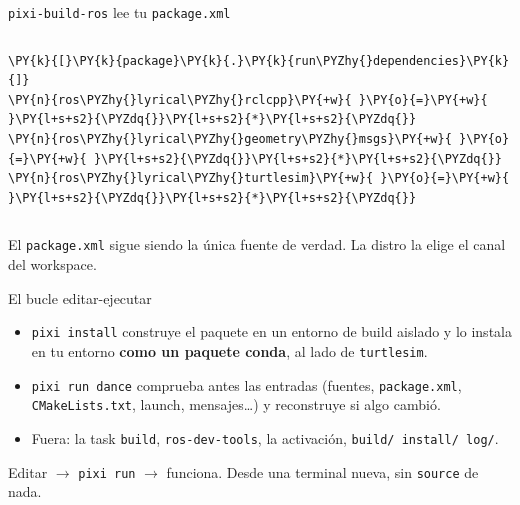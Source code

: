 \documentclass[aspectratio=169]{beamer}
\begin{document}
\begin{frame}[fragile]{\texttt{pixi-build-ros} lee tu \texttt{package.xml}}
\begin{columns}[T]
\begin{filelisting}
\begin{Verbatim}[commandchars=\\\{\},breaklines,breakanywhere]
\PY{k}{[}\PY{k}{package}\PY{k}{.}\PY{k}{run\PYZhy{}dependencies}\PY{k}{]}
\PY{n}{ros\PYZhy{}lyrical\PYZhy{}rclcpp}\PY{+w}{ }\PY{o}{=}\PY{+w}{ }\PY{l+s+s2}{\PYZdq{}}\PY{l+s+s2}{*}\PY{l+s+s2}{\PYZdq{}}
\PY{n}{ros\PYZhy{}lyrical\PYZhy{}geometry\PYZhy{}msgs}\PY{+w}{ }\PY{o}{=}\PY{+w}{ }\PY{l+s+s2}{\PYZdq{}}\PY{l+s+s2}{*}\PY{l+s+s2}{\PYZdq{}}
\PY{n}{ros\PYZhy{}lyrical\PYZhy{}turtlesim}\PY{+w}{ }\PY{o}{=}\PY{+w}{ }\PY{l+s+s2}{\PYZdq{}}\PY{l+s+s2}{*}\PY{l+s+s2}{\PYZdq{}}
\end{Verbatim}
\end{filelisting}
\end{columns}
\vfill
\centering \small El \lstinline|package.xml| sigue siendo la única fuente de verdad. La distro la elige el canal del workspace.
\end{frame}

\begin{frame}{El bucle editar-ejecutar}
\begin{itemize}
    \item \lstinline|pixi install| construye el paquete en un entorno de build aislado y lo instala en tu entorno \textbf{como un paquete conda}, al lado de \texttt{turtlesim}.
    \item \lstinline|pixi run dance| comprueba antes las entradas (fuentes, \lstinline|package.xml|, \lstinline|CMakeLists.txt|, launch, mensajes\ldots) y reconstruye si algo cambió.
    \item Fuera: la task \texttt{build}, \lstinline|ros-dev-tools|, la activación, \lstinline|build/ install/ log/|.
\end{itemize}
\vfill
\begin{block}{}
\centering Editar $\rightarrow$ \lstinline|pixi run| $\rightarrow$ funciona. Desde una terminal nueva, sin \texttt{source} de nada.
\end{block}
\end{frame}
\end{document}
